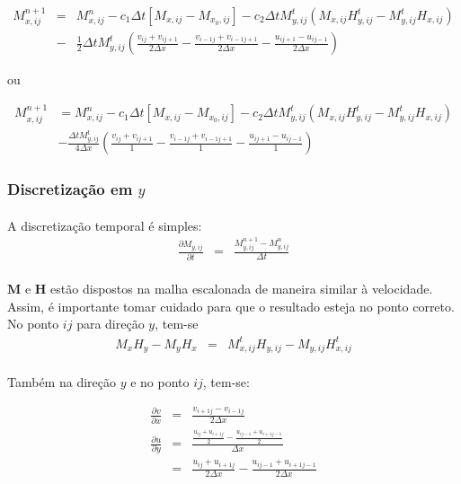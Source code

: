 \documentclass[eletromagnetismo.tex]{subfiles}
\begin{document}
\begin{eqnarray}
M_{x,ij}^{n+1} & = & M_{x,ij}^n -c_1\Delta t[M_{x,ij} - M_{x_0,ij}]-c_2 \Delta t M_{y,ij}^t(M_{x,ij} H_{y,ij}^t - M_{y,ij}^t H_{x,ij})\nonumber \\
&-&\frac{1}{2}\Delta t M_{y,ij}^t\left(\frac{v_{ij} + v_{ij+1}}{2\Delta x} - \frac{v_{i-1j} + v_{i-1j+1}}{2\Delta x} - \frac{u_{ij+1} - u_{ij-1}}{2\Delta x}\right)
\end{eqnarray}

ou

\begin{align}
M_{x,ij}^{n+1} & = M_{x,ij}^n -c_1\Delta t[M_{x,ij} - M_{x_0,ij}]-c_2 \Delta t M_{y,ij}^t(M_{x,ij} H_{y,ij}^t - M_{y,ij}^t H_{x,ij})\nonumber \\
&- \frac{\Delta t M_{y,ij}^t}{4\Delta x}\left(\frac{v_{ij} + v_{ij+1}}{1} - \frac{v_{i-1j} + v_{i-1j+1}}{1} - \frac{u_{ij+1} - u_{ij-1}}{1}\right)
\end{align}

\subsubsection{Discretização em $y$}

\paragraph{} A discretização temporal é simples:
\begin{eqnarray}
	\frac{\partial M_{y,ij}}{\partial t} & = & \frac{M_{y,ij}^{n+1} - M_{y,ij}^n}{\Delta t}
\end{eqnarray}

\paragraph{} $\mathbf{M}$ e $\mathbf{H}$ estão dispostos na malha escalonada de maneira similar à velocidade. Assim, é importante tomar cuidado para que o resultado esteja no ponto correto. No ponto $ij$ para direção $y$, tem-se \begin{eqnarray}
M_x H_y - M_y H_x & = & M_{x,ij}^t H_{y,ij} - M_{y,ij} H_{x,ij}^t
\end{eqnarray}

\paragraph{} Também na direção $y$ e no ponto $ij$, tem-se:

\begin{eqnarray}
	\frac{\partial v}{\partial x} & = & \frac{v_{i+1j} - v_{i-1j}}{2\Delta x}\\
	\frac{\partial u}{\partial y} & = & \frac{\frac{u_{ij} + u_{i+1j}}{2} - \frac{u_{ij-1} + u_{i+1j-1}}{2}}{\Delta x}\\
	&=& \frac{u_{ij} + u_{i+1j}}{2\Delta x} - \frac{u_{ij-1} + u_{i+1j-1}}{2\Delta x}
\end{eqnarray}
\end{document}
